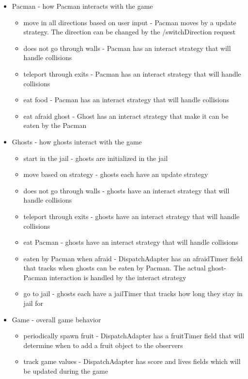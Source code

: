 \documentclass[letterpaper, 11pt]{article}
\begin{document}
\begin{itemize}
    \item Pacman - how Pacman interacts with the game
  \begin{itemize}
    \item move in all directions based on user input - Pacman moves by a update strategy. The direction can be changed by the /switchDirection request
    \item does not go through walls - Pacman has an interact strategy that will handle collisions
    \item teleport through exits - Pacman has an interact strategy that will handle collisions
    \item eat food - Pacman has an interact strategy that will handle collisions
    \item eat afraid ghost - Ghost has an interact strategy that make it can be eaten by the Pacman
  \end{itemize}
  \item Ghosts - how ghosts interact with the game
  \begin{itemize}
    \item start in the jail - ghosts are initialized in the jail
    \item move based on strategy - ghosts each have an update strategy
    \item does not go through walls - ghosts have an interact strategy that will handle collisions
    \item teleport through exits - ghosts have an interact strategy that will handle collisions
    \item eat Pacman - ghosts have an interact strategy that will handle collisions
    \item eaten by Pacman when afraid - DispatchAdapter has an afraidTimer field that tracks when ghosts can be eaten by Pacman. The actual ghost-Pacman interaction is handled by the interact strategy
    \item go to jail - ghosts each have a jailTimer that tracks how long they stay in jail for 
  \end{itemize}
  \item Game - overall game behavior
  \begin{itemize}
    \item periodically spawn fruit - DispatchAdapter has a fruitTimer field that will determine when to add a fruit object to the observers
    \item track game values - DispatchAdapter has score and lives fields which will be updated during the game
  \end{itemize}

\end{itemize}
\end{document}
